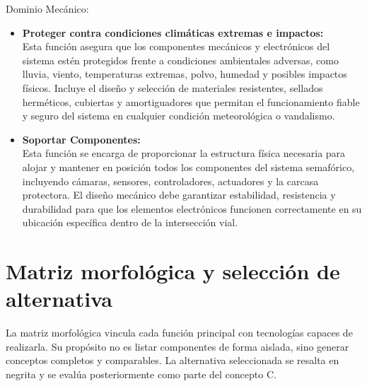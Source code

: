 \documentclass[12pt,a4paper,oneside]{report}
\begin{document}
Dominio Mecánico:

\begin{itemize}
\item
  \textbf{Proteger contra condiciones climáticas extremas e impactos:}\\
  Esta función asegura que los componentes mecánicos y electrónicos del sistema estén protegidos frente a condiciones ambientales adversas, como lluvia, viento, temperaturas extremas, polvo, humedad y posibles impactos físicos. Incluye el diseño y selección de materiales resistentes, sellados herméticos, cubiertas y amortiguadores que permitan el funcionamiento fiable y seguro del sistema en cualquier condición meteorológica o vandalismo.
\item
  \textbf{Soportar Componentes:}\\
  Esta función se encarga de proporcionar la estructura física necesaria para alojar y mantener en posición todos los componentes del sistema semafórico, incluyendo cámaras, sensores, controladores, actuadores y la carcasa protectora. El diseño mecánico debe garantizar estabilidad, resistencia y durabilidad para que los elementos electrónicos funcionen correctamente en su ubicación específica dentro de la intersección vial.
\end{itemize}

\section{Matriz morfológica y selección de alternativa}\label{matriz-morfologica-v2}

La matriz morfológica vincula cada función principal con tecnologías capaces de realizarla. Su propósito no es listar componentes de forma aislada, sino generar conceptos completos y comparables. La alternativa seleccionada se resalta en negrita y se evalúa posteriormente como parte del concepto C.
\end{document}
